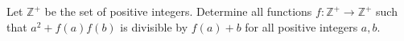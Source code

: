 Let $\mathbb{Z}^+$ be the set of positive integers. Determine all functions $f : \mathbb{Z}^+\to\mathbb{Z}^+$ such that $a^2+f(a)f(b)$ is divisible by $f(a)+b$ for all positive integers $a,b$.